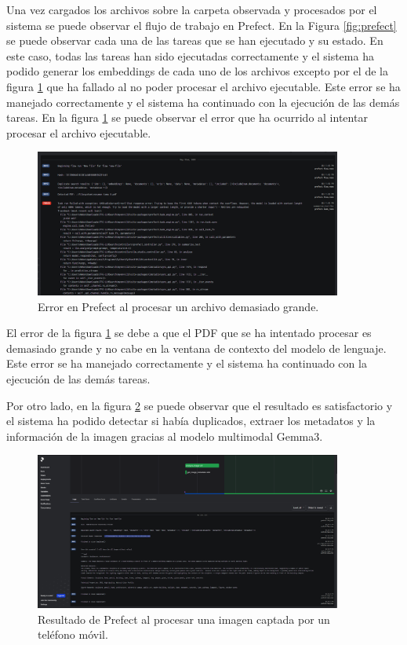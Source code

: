 Una vez cargados los archivos sobre la carpeta observada y procesados por el sistema se puede observar el flujo de trabajo en Prefect. En la Figura \ref{fig:prefect} se puede observar cada una de las tareas que se han ejecutado y su estado. En este caso, todas las tareas han sido ejecutadas correctamente y el sistema ha podido generar los embeddings de cada uno de los archivos excepto por el de la figura \ref{fig:prefect_fail} que ha fallado al no poder procesar el archivo ejecutable. Este error se ha manejado correctamente y el sistema ha continuado con la ejecución de las demás tareas. En la figura \ref{fig:prefect_fail} se puede observar el error que ha ocurrido al intentar procesar el archivo ejecutable.
\begin{figure}[H]
\centering
\includegraphics[width=0.9\textwidth]{archivos/prefect_fail.png}
\caption[Error en Prefect al procesar un archivo demasiado grande]{Error en Prefect al procesar un archivo demasiado grande.}
\label{fig:prefect_fail}
\end{figure}

El error de la figura \ref{fig:prefect_fail} se debe a que el PDF que se ha intentado procesar es demasiado grande y no cabe en la ventana de contexto del modelo de lenguaje. Este error se ha manejado correctamente y el sistema ha continuado con la ejecución de las demás tareas.

Por otro lado, en la figura \ref{fig:prefect_camera} se puede observar que el resultado es satisfactorio y el sistema ha podido detectar si había duplicados, extraer los metadatos y la información de la imagen gracias al modelo multimodal Gemma3.
\begin{figure}[H]
\centering
\includegraphics[width=0.9\textwidth]{archivos/prefect_camera.png}
\caption[Resultado de Prefect al procesar una imagen captada por un teléfono móvil]{Resultado de Prefect al procesar una imagen captada por un teléfono móvil.}
\label{fig:prefect_camera}
\end{figure}

